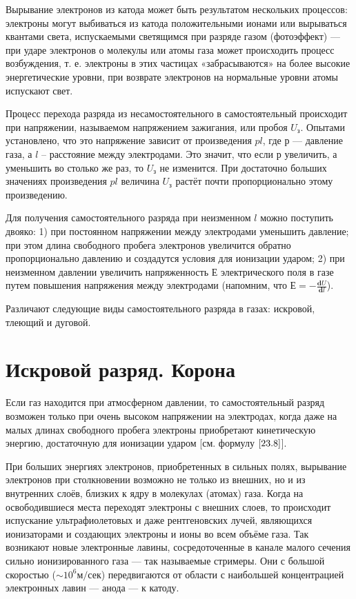 \documentclass[a4paper,10pt]{book}
\begin{document}
Вырывание электронов из катода может быть результатом нескольких процессов: электроны могут выбиваться из катода положительными ионами или вырываться квантами света, испускаемыми светящимся при разряде газом (фотоэффект) — при ударе электронов о молекулы или атомы газа может происходить процесс возбуждения, т. е. электроны в этих частицах «забрасываются» на более высокие энергетические уровни, при возврате электронов на нормальные уровни атомы испускают свет.

Процесс перехода разряда из несамостоятельного в самостоятельный происходит при напряжении, называемом напряжением зажигания, или пробоя $U_\text{з}$. Опытами установлено, что это напряжение зависит от произведения $pl$, где $р$ — давление газа, а $l$ -- расстояние между электродами. Это значит, что если $р$ увеличить, а  уменьшить во столько же раз, то $U_\text{з}$ не изменится. При достаточно больших значениях произведения $pl$ величина $U_\text{з}$ растёт почти пропорционально этому произведению.

Для получения самостоятельного разряда при неизменном $l$ можно поступить двояко:
1)	при постоянном напряжении между электродами уменьшить давление; при этом длина свободного пробега электронов увеличится обратно пропорционально давлению и создадутся условия для ионизации ударом;
2)	при неизменном давлении увеличить напряженность $Е$ электрического поля в газе путем повышения напряжения между электродами (напомним, что $Е = -\frac{\mathbf{d}U}{\mathbf{d}l}$).

Различают следующие виды самостоятельного разряда в газах: искровой, тлеющий и дуговой.

\section{Искровой разряд. Корона}

Если газ находится при атмосферном давлении, то самостоятельный разряд возможен только при очень высоком напряжении на электродах, когда даже на малых длинах свободного пробега электроны приобретают кинетическую энергию, достаточную для ионизации ударом [см. формулу $\ref{23.8}$].

При больших энергиях электронов, приобретенных в сильных полях, вырывание электронов при столкновении возможно не только из внешних, но и из внутренних слоёв, близких к ядру в молекулах (атомах) газа. Когда на освободившиеся места переходят электроны с внешних слоев, то происходит испускание ультрафиолетовых и даже рентгеновских лучей, являющихся ионизаторами и создающих электроны и ионы во всем объёме газа. Так возникают новые электронные лавины, сосредоточенные в канале малого сечения сильно ионизированного газа — так называемые стримеры. Они с большой скоростью ($\sim 10^6 \textit{м/сек}$) передвигаются от области с наибольшей концентрацией электронных лавин — анода — к катоду.
\end{document}
